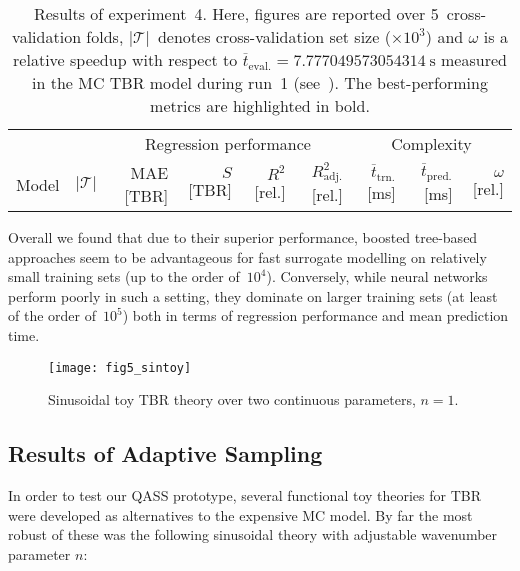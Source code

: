 \begin{table}[h]
	\centering
	\setlength\tabcolsep{2pt}
	{\scriptsize
		\begin{tabular}{lrrrrrrrr}
		\toprule
		{} & {} & \multicolumn{4}{c}{Regression performance} &
		\multicolumn{3}{c}{Complexity}\\
		\cmidrule(lr){3-6}
		\cmidrule(lr){7-9}
		Model & $|\mathcal{T}|$ & MAE [TBR] & $S$ [TBR] & $R^2$ [rel.] & $R^2_{\text{adj.}}$ [rel.]
						& $\overline{t}_{\text{trn.}}$ [\si{\milli\second}] &
		$\overline{t}_{\text{pred.}}$ [\si{\milli\second}] & $\omega$ [rel.]\\
		\midrule
		
		\bottomrule
		\end{tabular}
	}
	\caption{Results of experiment~4. Here, figures are reported over 5~cross-validation folds,
		$|\mathcal{T}|$~denotes cross-validation set size ($\times 10^3$)
		and $\omega$ is a relative speedup with respect to
		$\overline{t}_{\text{eval.}}=\SI{7.777049573054314}{\second}$
		measured in the MC TBR model during run~1 (see~).
		The best-performing metrics are highlighted in bold.}
	\label{tbl:exp4-detailed-results}
\end{table}

Overall we found that due to their superior performance, boosted tree-based
approaches seem to be advantageous for fast surrogate modelling on relatively small training
sets (up to the order of~$10^4$). Conversely, while neural networks perform
poorly in such a setting, they dominate on larger training sets (at least of the
order of~$10^5$) both in terms of regression performance and mean prediction time.

\begin{figure}
	\centering
	\texttt{[image: fig5\_sintoy]}
	\caption{Sinusoidal toy TBR theory over two continuous parameters,
	$n=1$.}
	\label{fig:sintoy}
\end{figure}

\subsection{Results of Adaptive Sampling}
\label{sec:adaptiveres}
In order to test our QASS prototype, several functional toy theories for TBR were developed as alternatives to the expensive MC model. By far the most robust of these was the following sinusoidal theory with adjustable wavenumber parameter $n$:

